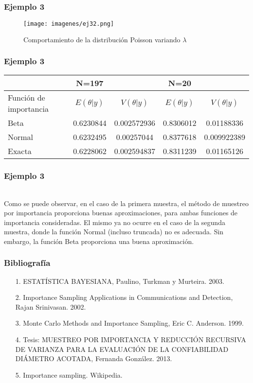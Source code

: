 \documentclass[12pt]{beamer}
\begin{document}
\begin{frame}
\frametitle{Ejemplo 3}
\begin{figure}[!h]
    \begin{center}
        \texttt{[image: imagenes/ej32.png]}
        \caption{Comportamiento de la distribución Poisson variando $\lambda$}
        \label{fig:Densidad}
    \end{center}
\end{figure}
\end{frame}

\begin{frame}
\frametitle{Ejemplo 3}
\center
\begin{tabular}{|p{2.2cm}|cc|cc|}
\hline 
 & N=197 &  & N=20 &  \\ 
\hline 
Función de importancia & $E(\theta|y)$ & $V(\theta|y)$ & $E(\theta|y)$ & $V(\theta|y)$ \\ 
\hline 
Beta &  0.6230844 & 0.002572936 & 0.8306012 & 0.01188336 \\ 
\hline 
Normal & 0.6232495 & 0.00257044 & 0.8377618 & 0.009922389 \\ 
\hline 
Exacta & 0.6228062 & 0.002594837 & 0.8311239 & 0.01165126 \\ 
\hline 
\end{tabular} 
\end{frame}


\begin{frame}
\frametitle{Ejemplo 3}
~\\Como se puede observar, en el caso de la primera muestra, el método de muestreo por importancia proporciona buenas aproximaciones, para ambas funciones de importancia consideradas.  El mismo ya no ocurre en el caso de la segunda muestra, donde la función Normal (incluso truncada) no es adecuada. Sin embargo, la función Beta proporciona una buena aproximación. 
\end{frame}

\begin{frame}
\frametitle{Bibliografía}
\begin{itemize}
\item[1.]ESTATÍSTICA BAYESIANA, Paulino, Turkman y Murteira. 2003.
\item[2.]Importance Sampling Applications in Communications and Detection, Rajan Srinivasan. 2002.
\item[3.]Monte Carlo Methods and Importance Sampling, Eric C. Anderson. 1999.
\item[4.]Tesis: MUESTREO POR IMPORTANCIA Y REDUCCIÓN RECURSIVA DE VARIANZA PARA LA EVALUACIÓN DE LA CONFIABILIDAD DIÁMETRO ACOTADA, Fernanda González. 2013.
\item[5.]Importance sampling. Wikipedia.
\end{itemize}
\end{frame}
\end{document}

